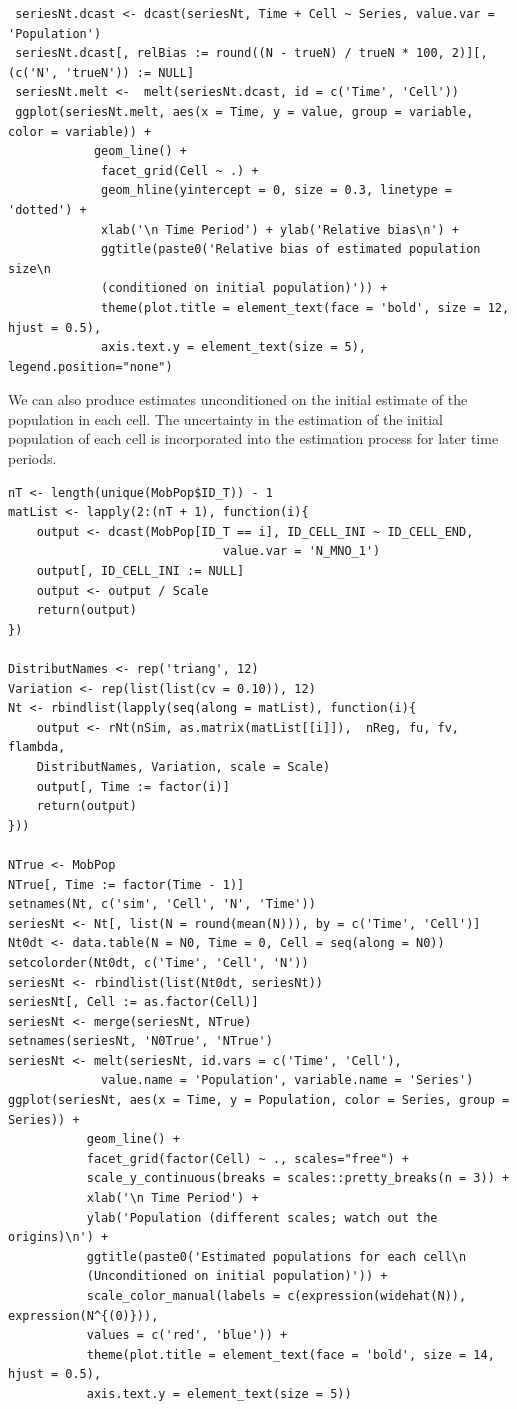 \documentclass[12pt, a4paper]{article}
\begin{document}
 \begin{verbatim}
 seriesNt.dcast <- dcast(seriesNt, Time + Cell ~ Series, value.var = 'Population')
 seriesNt.dcast[, relBias := round((N - trueN) / trueN * 100, 2)][, (c('N', 'trueN')) := NULL]
 seriesNt.melt <-  melt(seriesNt.dcast, id = c('Time', 'Cell'))
 ggplot(seriesNt.melt, aes(x = Time, y = value, group = variable, color = variable)) + 
            geom_line() + 
             facet_grid(Cell ~ .) +
             geom_hline(yintercept = 0, size = 0.3, linetype = 'dotted') + 
             xlab('\n Time Period') + ylab('Relative bias\n') +
             ggtitle(paste0('Relative bias of estimated population size\n 
             (conditioned on initial population)')) +
             theme(plot.title = element_text(face = 'bold', size = 12, hjust = 0.5), 
             axis.text.y = element_text(size = 5), legend.position="none")
 \end{verbatim}
 
We can also produce estimates unconditioned on the initial estimate of the population in each cell. 
The uncertainty in the estimation of the initial population of each cell is incorporated into the estimation 
process for later time periods.
 
\begin{verbatim}
nT <- length(unique(MobPop$ID_T)) - 1
matList <- lapply(2:(nT + 1), function(i){
    output <- dcast(MobPop[ID_T == i], ID_CELL_INI ~ ID_CELL_END, 
                              value.var = 'N_MNO_1')
    output[, ID_CELL_INI := NULL]
    output <- output / Scale
    return(output)
})

DistributNames <- rep('triang', 12)
Variation <- rep(list(list(cv = 0.10)), 12)
Nt <- rbindlist(lapply(seq(along = matList), function(i){
    output <- rNt(nSim, as.matrix(matList[[i]]),  nReg, fu, fv, flambda, 
    DistributNames, Variation, scale = Scale)
    output[, Time := factor(i)]
    return(output)
}))

NTrue <- MobPop
NTrue[, Time := factor(Time - 1)]
setnames(Nt, c('sim', 'Cell', 'N', 'Time'))
seriesNt <- Nt[, list(N = round(mean(N))), by = c('Time', 'Cell')]
Nt0dt <- data.table(N = N0, Time = 0, Cell = seq(along = N0))
setcolorder(Nt0dt, c('Time', 'Cell', 'N'))
seriesNt <- rbindlist(list(Nt0dt, seriesNt))
seriesNt[, Cell := as.factor(Cell)]
seriesNt <- merge(seriesNt, NTrue)
setnames(seriesNt, 'N0True', 'NTrue')
seriesNt <- melt(seriesNt, id.vars = c('Time', 'Cell'), 
             value.name = 'Population', variable.name = 'Series')
ggplot(seriesNt, aes(x = Time, y = Population, color = Series, group = Series)) + 
           geom_line() + 
           facet_grid(factor(Cell) ~ ., scales="free") +
           scale_y_continuous(breaks = scales::pretty_breaks(n = 3)) +
           xlab('\n Time Period') + 
           ylab('Population (different scales; watch out the origins)\n') +
           ggtitle(paste0('Estimated populations for each cell\n 
           (Unconditioned on initial population)')) +
           scale_color_manual(labels = c(expression(widehat(N)), expression(N^{(0)})), 
           values = c('red', 'blue')) +
           theme(plot.title = element_text(face = 'bold', size = 14, hjust = 0.5), 
           axis.text.y = element_text(size = 5))
\end{verbatim}
\end{document}

